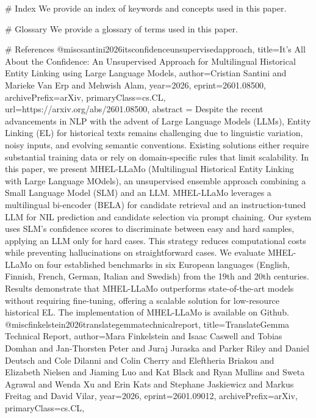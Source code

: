         # Index
        We provide an index of keywords and concepts used in this paper.

        # Glossary
        We provide a glossary of terms used in this paper.

        # References
        @misc{santini2026itsconfidenceunsupervisedapproach,
      title={It's All About the Confidence: An Unsupervised Approach for Multilingual Historical Entity Linking using Large Language Models}, 
      author={Cristian Santini and Marieke Van Erp and Mehwish Alam},
      year={2026},
      eprint={2601.08500},
      archivePrefix={arXiv},
      primaryClass={cs.CL},
      url={https://arxiv.org/abs/2601.08500},
      abstract = {Despite the recent advancements in NLP with the advent of Large Language Models (LLMs), Entity Linking (EL) for historical texts remains challenging due to linguistic variation, noisy inputs, and evolving semantic conventions. Existing solutions either require substantial training data or rely on domain-specific rules that limit scalability. In this paper, we present MHEL-LLaMo (Multilingual Historical Entity Linking with Large Language MOdels), an unsupervised ensemble approach combining a Small Language Model (SLM) and an LLM. MHEL-LLaMo leverages a multilingual bi-encoder (BELA) for candidate retrieval and an instruction-tuned LLM for NIL prediction and candidate selection via prompt chaining. Our system uses SLM's confidence scores to discriminate between easy and hard samples, applying an LLM only for hard cases. This strategy reduces computational costs while preventing hallucinations on straightforward cases. We evaluate MHEL-LLaMo on four established benchmarks in six European languages (English, Finnish, French, German, Italian and Swedish) from the 19th and 20th centuries. Results demonstrate that MHEL-LLaMo outperforms state-of-the-art models without requiring fine-tuning, offering a scalable solution for low-resource historical EL. The implementation of MHEL-LLaMo is available on Github.}
}@misc{finkelstein2026translategemmatechnicalreport,
      title={TranslateGemma Technical Report}, 
      author={Mara Finkelstein and Isaac Caswell and Tobias Domhan and Jan-Thorsten Peter and Juraj Juraska and Parker Riley and Daniel Deutsch and Cole Dilanni and Colin Cherry and Eleftheria Briakou and Elizabeth Nielsen and Jiaming Luo and Kat Black and Ryan Mullins and Sweta Agrawal and Wenda Xu and Erin Kats and Stephane Jaskiewicz and Markus Freitag and David Vilar},
      year={2026},
      eprint={2601.09012},
      archivePrefix={arXiv},
      primaryClass={cs.CL},
}
